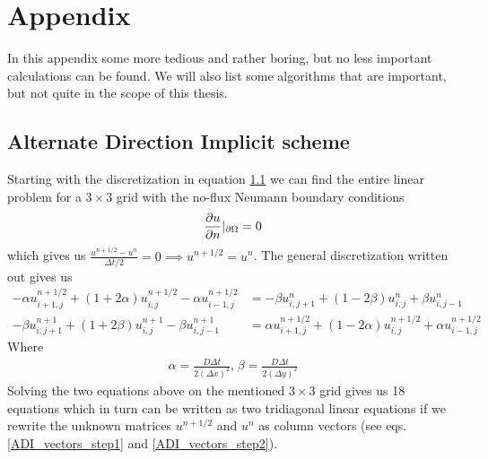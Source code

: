 \section{Appendix}

In this appendix some more tedious and rather boring, but no less important calculations can be found. 
We will also list some algorithms that are important, but not quite in the scope of this thesis.

\subsection{Alternate Direction Implicit scheme}
Starting with the discretization in equation \ref{} we can find the entire linear problem for a $3\times3$ grid with the no-flux Neumann boundary conditions
\begin{equation*}
 \frac{\partial u}{\partial n}|_{\partial\Omega} = 0
\end{equation*}
which gives us $\frac{u^{n+1/2}-u^n}{\Delta t/2} = 0 \implies u^{n+1/2}=u^n$.
The general discretization written out gives us
\begin{align*}
 -\alpha u_{i+1,j}^{n+1/2} +(1+2\alpha)u_{i,j}^{n+1/2} -\alpha u_{i-1,j}^{n+1/2} &= -\beta u_{i,j+1}^{n}+(1-2\beta)u_{i,j}^{n} +\beta u_{i,j-1}^{n} \\
 -\beta u_{i,j+1}^{n+1} +(1+2\beta)u_{i,j}^{n+1} -\beta u_{i,j-1}^{n+1} &=\alpha u_{i+1,j}^{n+1/2} +(1-2\alpha)u_{i,j}^{n+1/2} +\alpha u_{i-1,j}^{n+1/2}
\end{align*}
Where 
\begin{align*}
 \alpha = \frac{D\Delta t}{2(\Delta x)^2}\text{,}\; \beta = \frac{D\Delta t}{2(\Delta y)^2}
\end{align*}
Solving the two equations above on the mentioned $3\times3$ grid gives us 18 equations which in turn can be written as two tridiagonal linear equations if we rewrite the unknown matrices $u^{n+1/2}$ and $u^n$ as column vectors (see eqs. \ref{ADI_vectors_step1} and \ref{ADI_vectors_step2}). 

